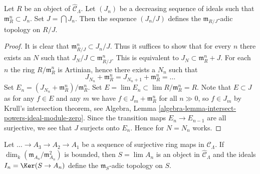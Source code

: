 \begin{lemma}
\label{lemma-m-adic-topology}
Let $R$ be an object of $\widehat{\mathcal{C}}_\Lambda$. Let $(J_n)$ be a
decreasing sequence of ideals such that $\mathfrak m_R^n \subset J_n$.
Set $J = \bigcap J_n$. Then the sequence $(J_n/J)$ defines the
$\mathfrak m_{R/J}$-adic topology on $R/J$.
\end{lemma}

\begin{proof}
It is clear that $\mathfrak m_{R/J}^n \subset J_n/J$. Thus it suffices
to show that for every $n$ there exists an $N$ such that
$J_N/J \subset \mathfrak m_{R/J}^n$. This is equivalent to
$J_N \subset \mathfrak m_R^n + J$. For each $n$ the ring $R/\mathfrak m_R^n$
is Artinian, hence there exists a $N_n$ such that
$$
J_{N_n} + \mathfrak m_R^n = J_{N_n + 1} + \mathfrak m_R^n = \ldots
$$
Set $E_n = (J_{N_n} + \mathfrak m_R^n)/\mathfrak m_R^n$.
Set $E = \lim E_n \subset \lim R/\mathfrak m_R^n = R$.
Note that $E \subset J$ as for any $f \in E$ and any $m$
we have $f \in J_m + \mathfrak m_R^n$ for all $n \gg 0$, so
$f \in J_m$ by Krull's intersection theorem, see
Algebra, Lemma \ref{algebra-lemma-intersect-powers-ideal-module-zero}.
Since the transition maps $E_n \to E_{n - 1}$ are all surjective,
we see that $J$ surjects onto $E_n$. Hence for $N = N_n$ works.
\end{proof}

\begin{lemma}
\label{lemma-limit-artinian}
Let $\ldots \to A_3 \to A_2 \to A_1$ be a sequence of surjective
ring maps in $\mathcal{C}_\Lambda$. If
$\dim_k (\mathfrak m_{A_n}/\mathfrak m_{A_n}^2)$ is bounded, then
$S = \lim A_n$ is an object in $\widehat{\mathcal{C}}_\Lambda$
and the ideals $I_n = \Ker(S \to A_n)$ define the
$\mathfrak m_S$-adic topology on $S$.
\end{lemma}

